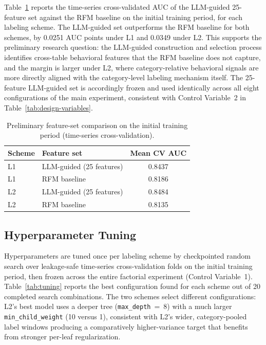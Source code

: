 Table~\ref{tab:feature-comparison} reports the time-series cross-validated AUC of the LLM-guided 25-feature set against the RFM baseline on the initial training period, for each labeling scheme. The LLM-guided set outperforms the RFM baseline for both schemes, by 0.0251 AUC points under L1 and 0.0349 under L2. This supports the preliminary research question: the LLM-guided construction and selection process identifies cross-table behavioral features that the RFM baseline does not capture, and the margin is larger under L2, where category-relative behavioral signals are more directly aligned with the category-level labeling mechanism itself. The 25-feature LLM-guided set is accordingly frozen and used identically across all eight configurations of the main experiment, consistent with Control Variable~2 in Table~\ref{tab:design-variables}.

\begin{table}[htbp]
  \centering
  \footnotesize
  \begin{tabular}{l l c}
    \toprule
    Scheme & Feature set & Mean CV AUC \\
    \midrule
    L1 & LLM-guided (25 features) & 0.8437 \\
    L1 & RFM baseline & 0.8186 \\
    L2 & LLM-guided (25 features) & 0.8484 \\
    L2 & RFM baseline & 0.8135 \\
    \bottomrule
  \end{tabular}
  \caption{Preliminary feature-set comparison on the initial training period (time-series cross-validation).}
  \label{tab:feature-comparison}
\end{table}

\subsection{Hyperparameter Tuning}

Hyperparameters are tuned once per labeling scheme by checkpointed random search over leakage-safe time-series cross-validation folds on the initial training period, then frozen across the entire factorial experiment (Control Variable~1). Table~\ref{tab:tuning} reports the best configuration found for each scheme out of 20 completed search combinations. The two schemes select different configurations: L2's best model uses a deeper tree (\texttt{max\_depth}~=~8) with a much larger \texttt{min\_child\_weight} (10 versus 1), consistent with L2's wider, category-pooled label windows producing a comparatively higher-variance target that benefits from stronger per-leaf regularization.

